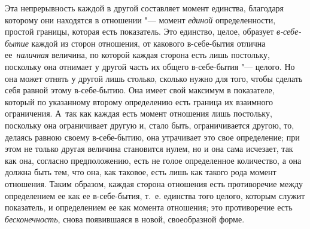 Эта непрерывность каждой в другой составляет момент единства, благодаря
которому они находятся в отношении "--- момент {\em единой} определенности,
простой границы, которая есть показатель. Это единство, целое, образует
{\em в-себе-бытие} каждой из сторон отношения, от какового в-себе-бытия отлична
ее~{\em наличная} величина, по которой каждая сторона есть лишь постольку,
поскольку она отнимает у другой часть их общего в-себе-бытия "--- целого. Но
она может отнять у другой лишь столько, сколько нужно для того, чтобы сделать
себя равной этому в-себе-бытию. Она имеет свой максимум в показателе, который
по указанному второму определению есть граница их взаимного ограничения. А~так
как каждая есть момент отношения лишь постольку, поскольку она ограничивает
другую и, стало быть, ограничивается другою, то, делаясь равною своему
в-себе-бытию, она утрачивает это свое определение; при этом не только другая
величина становится нулем, но и она сама исчезает, так как она,
согласно предположению, есть не голое определенное количество, а она должна
быть тем, что она, как таковое, есть лишь как такого рода момент отношения.
Таким образом, каждая сторона отношения есть противоречие между определением ее
как ее в-себе-бытия, т.~е. единства того целого, которым служит показатель, и
определением ее как момента отношения; это противоречие есть
{\em бесконечность}, снова появившаяся в новой, своеобразной форме.

